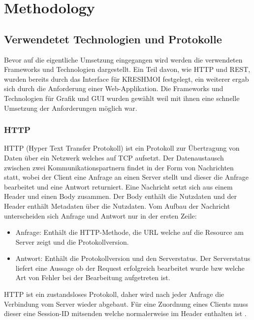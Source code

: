 
\section{Methodology}
\label{sec:methodology}

\subsection{Verwendetet Technologien und Protokolle}
\label{sec:Verwendetet Technologien}
Bevor auf die eigentliche Umsetzung eingegangen wird werden die verwendeten Frameworks und Technologien dargestellt.
Ein Teil davon, wie HTTP und REST, wurden bereits durch das Interface für KRESHMOI festgelegt, 
ein weiterer ergab sich durch die Anforderung einer Web-Applikation.
Die Frameworks und Technologien für Grafik und GUI wurden gewählt weil mit ihnen eine schnelle Umsetzung der Anforderungen möglich war.

\subsubsection{HTTP}
\label{sec:HTTP}
HTTP (Hyper Text Transfer Protokoll) ist ein Protokoll zur Übertragung von Daten über ein Netzwerk welches auf TCP aufsetzt.
Der Datenaustausch zwischen zwei Kommunikationspartnern findet in der Form von Nachrichten statt, 
wobei der Client eine Anfrage an einen Server stellt und dieser die Anfrage bearbeitet und eine Antwort returniert.
%
Eine Nachricht setzt sich aus einem Header und einen Body zusammen.
Der Body enthält die Nutzdaten und der Header enthält Metadaten über die Nutzdaten.
Vom Aufbau der Nachricht unterscheiden sich Anfrage und Antwort nur in der ersten Zeile:
\begin{itemize}
	\item Anfrage: Enthält die HTTP-Methode, die URL welche auf die Resource am Server zeigt und die Protokollversion.
	\item Antwort: Enthält die Protokollversion und den Serverstatus. 
		Der Serverstatus liefert eine Aussage ob der Request erfolgreich bearbeitet wurde bzw welche Art von Fehler bei der Bearbeitung aufgetreten ist.
\end{itemize}
HTTP ist ein zustandsloses Protokoll, daher wird nach jeder Anfrage die Verbindung vom Server wieder abgebaut.
Für eine Zuordnung eines Clients muss dieser eine Session-ID mitsenden welche normalerweise im Header enthalten ist \cite{http}.

